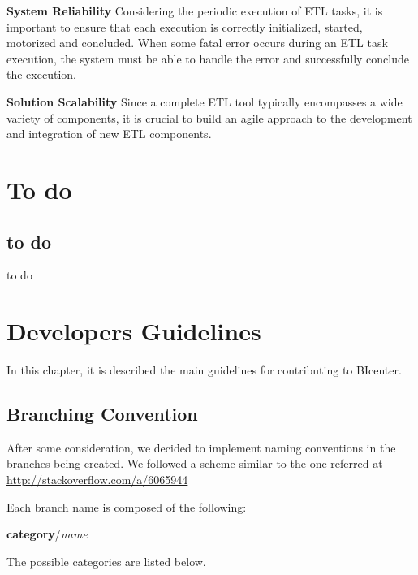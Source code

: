 \documentclass[
  11pt,
]{krantz}
\begin{document}
\textbf{System Reliability}
Considering the periodic execution of ETL tasks, it is important to ensure that each execution is correctly initialized, started, motorized and concluded. When some fatal error occurs during an ETL task execution, the system must be able to handle the error and successfully conclude the execution.

\textbf{Solution Scalability}
Since a complete ETL tool typically encompasses a wide variety of components, it is crucial to build an agile approach to the development and integration of new ETL components.

\hypertarget{to-do}{%
\chapter{To do}\label{to-do}}

\hypertarget{to-do-1}{%
\section{to do}\label{to-do-1}}

to do

\hypertarget{developers-guidelines}{%
\chapter{Developers Guidelines}\label{developers-guidelines}}

In this chapter, it is described the main guidelines for contributing to BIcenter.

\hypertarget{branching-convention}{%
\section{Branching Convention}\label{branching-convention}}

After some consideration, we decided to implement naming conventions in the branches being created. We followed a scheme similar to the one referred at \url{http://stackoverflow.com/a/6065944}

Each branch name is composed of the following:

\textbf{category}/\emph{name}

The possible categories are listed below.
\end{document}
